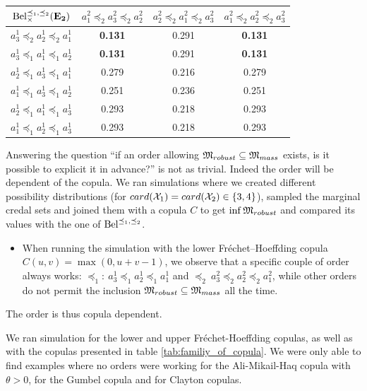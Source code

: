 \begin{example}
\begin{center}
\begin{tabular}{|c||c|c|c|}
\hline
${\mathrm{Bel}}^{\preceq_1,\preceq_2}_\times(\mathbf{E_2})$ & $a^2_1\preceq_2a^2_3\preceq_2a^2_2$ & $a^2_2\preceq_2a^2_1\preceq_2a^2_3$ & $a^2_1\preceq_2a^2_2\preceq_2a^2_3$ \\ \hline\hline
$a^1_3\preceq_2a^1_2\preceq_2a^1_1$ & \textbf{0.131} & 0.291 & \textbf{0.131} \\ \hline
$a^1_3\preceq_1a^1_1\preceq_1a^1_2$ & \textbf{0.131} & 0.291 & \textbf{0.131} \\ \hline
$a^1_2\preceq_1a^1_3\preceq_1a^1_1$ & 0.279 & 0.216 & 0.279 \\ \hline
$a^1_1\preceq_1a^1_3\preceq_1a^1_2$ & 0.251 & 0.236 & 0.251 \\ \hline
$a^1_2\preceq_1a^1_1\preceq_1a^1_3$ & 0.293 & 0.218 & 0.293 \\ \hline
$a^1_1\preceq_1a^1_2\preceq_1a^1_3$ & 0.293 & 0.218 & 0.293 \\ \hline
\end{tabular}
\label{tab:beliefs_orders}
\end{center}

Answering the question ``if an order allowing ${\mathfrak{M}}_{robust}\subseteq{\mathfrak{M}}_{mass}$ exists, is it possible to explicit it in advance?'' is not as trivial. Indeed the order will be dependent of the copula. We ran simulations where we created different possibility distributions (for $card({\mathcal{X}}_1)=card({\mathcal{X}}_2)\in\{3,4\}$), sampled the marginal credal sets and joined them with a copula $C$ to get $\inf{\mathfrak{M}}_{robust}$ and compared its values with the one of ${\mathrm{Bel}}^{\preceq_1,\preceq_2}$.
\begin{itemize}
	\item When running the simulation with the lower Fréchet–Hoeffding copula $C(u,v)=\max(0,u+v-1)$, we observe that a specific couple of order always works: $\preceq_1:~a^1_3\preceq_1a^1_2\preceq_1a^1_1$ and $\preceq_2~a^2_3\preceq_2a^2_2\preceq_2a^2_1$, while other orders do not permit the inclusion ${\mathfrak{M}}_{robust}\subseteq{\mathfrak{M}}_{mass}$ all the time.
\end{itemize}
The order is thus copula dependent.

We ran simulation for the lower and upper Fréchet-Hoeffding copulas, as well as with the copulas presented in table \ref{tab:familiy_of_copula}. We were only able to find examples where no orders were working for the Ali-Mikail-Haq copula with $\theta>0$, for the Gumbel copula and for Clayton copulas. 
\end{example}
\pagebreak
\blankpage